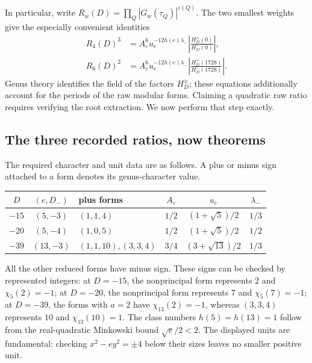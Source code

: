 In particular, write
$R_w(D)=\prod_Q|G_w(\tau_Q)|^{\varepsilon(Q)}$. The two smallest
weights give the especially convenient identities
\begin{align}
 R_4(D)^3
 &=A_\varepsilon^6u_e^{-12h(e)\lambda_-}
       \left|\frac{H_D^+(0)}{H_D^-(0)}\right|,
       \label{cmgenus:eq:four}\\
 R_6(D)^2
 &=A_\varepsilon^6u_e^{-12h(e)\lambda_-}
       \left|\frac{H_D^+(1728)}{H_D^-(1728)}\right|.
       \label{cmgenus:eq:six}
\end{align}
Genus theory identifies the field of the factors $H_D^\pm$; these
equations additionally account for the periods of the raw modular
forms. Claiming a quadratic raw ratio requires verifying the root
extraction. We now perform that step exactly.

\subsection{The three recorded ratios, now theorems}

The required character and unit data are as follows. A plus or minus
sign attached to a form denotes its genus-character value.
\begin{center}
\begin{tabular}{@{}cclccc@{}}
\toprule
$D$&$(e,D_-)$&plus forms&$A_\varepsilon$&$u_e$&$\lambda_-$\\
\midrule
$-15$&$(5,-3)$&$(1,1,4)$&$1/2$&$(1+\sqrt5)/2$&$1/3$\\
$-20$&$(5,-4)$&$(1,0,5)$&$1/2$&$(1+\sqrt5)/2$&$1/2$\\
$-39$&$(13,-3)$&$(1,1,10),(3,3,4)$&$3/4$&$(3+\sqrt{13})/2$&$1/3$\\
\bottomrule
\end{tabular}
\end{center}
All the other reduced forms have minus sign. These signs can be
checked by represented integers: at $D=-15$, the nonprincipal form
represents $2$ and $\chi_5(2)=-1$; at $D=-20$, the nonprincipal form
represents $7$ and $\chi_5(7)=-1$; at $D=-39$, the forms with $a=2$
have $\chi_{13}(2)=-1$, whereas $(3,3,4)$ represents $10$ and
$\chi_{13}(10)=1$.
The class numbers $h(5)=h(13)=1$ follow from the real-quadratic
Minkowski bound $\sqrt e/2<2$.
The displayed units are fundamental: checking
$x^2-ey^2=\pm4$ below their sizes leaves no smaller positive unit.

